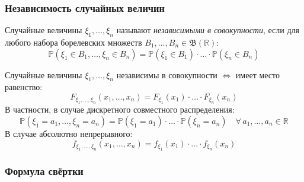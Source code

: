 \subsubsection{Независимость случайных величин}
\begin{defn}
    Случайные величины $\xi_1, \ldots, \xi_n$ называют \textit{независимыми в совокупности}, если для любого набора борелевских множеств $B_{1}, \ldots, B_{n} \in \mathfrak{B}(\mathbb{R})$:
    \begin{equation*}
        \mathbb{P}\left(\xi_{1} \in B_{1}, \ldots, \xi_{n} \in B_{n}\right)=\mathbb{P}\left(\xi_{1} \in B_{1}\right) \cdot \ldots \cdot \mathbb{P}\left(\xi_{n} \in B_{n}\right)
    \end{equation*}
\end{defn}
\begin{namedthm}
    Случайные величины $\xi_1, \ldots, \xi_n$ независимы в совокупности $\Leftrightarrow$ имеет место равенство:
    \begin{equation*}
        F_{\xi_{1}, \ldots, \xi_{n}}\left(x_{1}, \ldots, x_{n}\right)=F_{\xi_{1}}\left(x_{1}\right) \cdot \ldots \cdot F_{\xi_{n}}\left(x_{n}\right)
    \end{equation*}
    В частности, в случае дискретного совместного распределения:
    \begin{equation*}
        \mathbb{P}\left(\xi_{1}=a_{1}, \ldots, \xi_{n}=a_{n}\right)=\mathbb{P}\left(\xi_{1}=a_{1}\right) \cdot \ldots \cdot \mathbb{P}\left(\xi_{n}=a_{n}\right) \quad \forall \, a_1, \ldots, a_n \in \mathbb{R}
    \end{equation*}
    В случае абсолютно непрерывного:
    \begin{equation*}
        f_{\xi_{1}, \ldots, \xi_{n}}\left(x_{1}, \ldots, x_{n}\right)=f_{\xi_{1}}\left(x_{1}\right) \cdot \ldots \cdot f_{\xi_{n}}\left(x_{n}\right)
    \end{equation*}
\end{namedthm}

\subsubsection{Формула свёртки}

